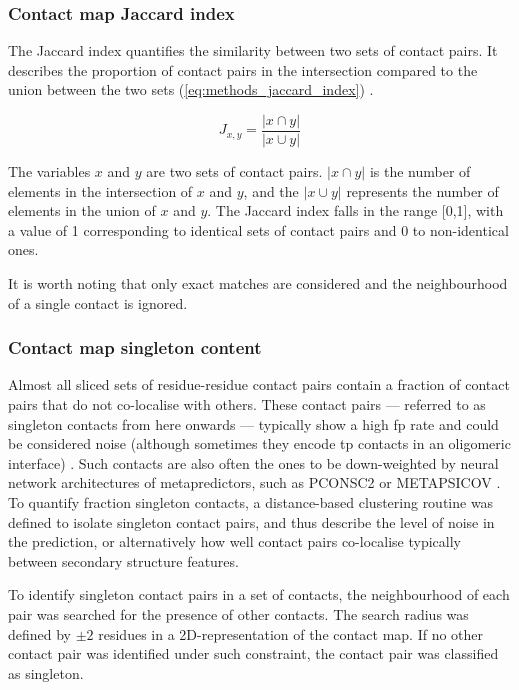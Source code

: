 \subsubsection{Contact map Jaccard index}
The Jaccard index quantifies the similarity between two sets of contact pairs. It describes the proportion of contact pairs in the intersection compared to the union between the two sets (\cref{eq:methods_jaccard_index}) \cite{Wuyun2016-hh}.

\begin{equation}
    J_{x,y}=\frac{\left |x \cap y\right |}{\left |x \cup y\right |}
    \label{eq:methods_jaccard_index}
\end{equation}

The variables $x$ and $y$ are two sets of contact pairs. $\left |x \cap y\right |$ is the number of elements in the intersection of $x$ and $y$, and the $\left |x \cup y\right |$ represents the number of elements in the union of $x$ and $y$. The Jaccard index falls in the range [0,1], with a value of 1 corresponding to identical sets of contact pairs and 0 to non-identical ones. 

It is worth noting that only exact matches are considered and the neighbourhood of a single contact is ignored.
\subsubsection{Contact map singleton content}
Almost all sliced sets of residue-residue contact pairs contain a fraction of contact pairs that do not co-localise with others. These contact pairs --- referred to as singleton contacts from here onwards --- typically show a high \gls{fp} rate and could be considered noise (although sometimes they encode \gls{tp} contacts in an oligomeric interface) \cite{Skwark2014-qp}. Such contacts are also often the ones to be down-weighted by neural network architectures of metapredictors, such as PCONSC2 \cite{Skwark2014-qp} or METAPSICOV \cite{Jones2015-vq}. To quantify fraction singleton contacts, a distance-based clustering routine was defined to isolate singleton contact pairs, and thus describe the level of noise in the prediction, or alternatively how well contact pairs co-localise typically between secondary structure features.

To identify singleton contact pairs in a set of contacts, the neighbourhood of each pair was searched for the presence of other contacts. The search radius was defined by $\pm2$ residues in a 2D-representation of the contact map. If no other contact pair was identified under such constraint, the contact pair was classified as singleton.

